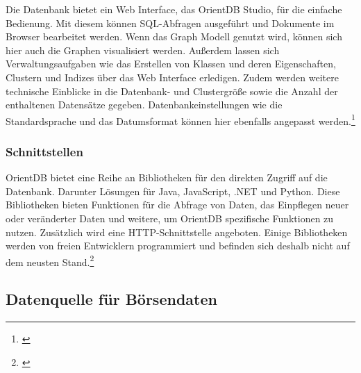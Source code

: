 
Die Datenbank bietet ein Web Interface, das OrientDB Studio, für die einfache Bedienung. Mit diesem können \gls{SQL}-Abfragen ausgeführt und Dokumente im Browser bearbeitet werden. Wenn das Graph Modell genutzt wird, können sich hier auch die Graphen visualisiert werden. Außerdem lassen sich Verwaltungsaufgaben wie das Erstellen von Klassen und deren Eigenschaften, Clustern und Indizes über das Web Interface erledigen. Zudem werden weitere technische Einblicke in die Datenbank- und Clustergröße sowie die Anzahl der enthaltenen Datensätze gegeben. Datenbankeinstellungen wie die Standardsprache und das Datumsformat können hier ebenfalls angepasst werden.\footnote{\cite[Vgl.][]{OrientDBStudio}}

\subsubsection{Schnittstellen}


OrientDB bietet eine Reihe an Bibliotheken für den direkten Zugriff auf die Datenbank. Darunter Lösungen für Java, JavaScript, .NET und Python. Diese Bibliotheken bieten Funktionen für die Abfrage von Daten, das Einpflegen neuer oder veränderter Daten und weitere, um OrientDB spezifische Funktionen zu nutzen. Zusätzlich wird eine \gls{HTTP}-Schnittstelle angeboten. Einige Bibliotheken werden von freien Entwicklern programmiert und befinden sich deshalb nicht auf dem neusten Stand.\footnote{\cite[Vgl.][]{OrientDBBindings}}

\subsection{Datenquelle für Börsendaten}


